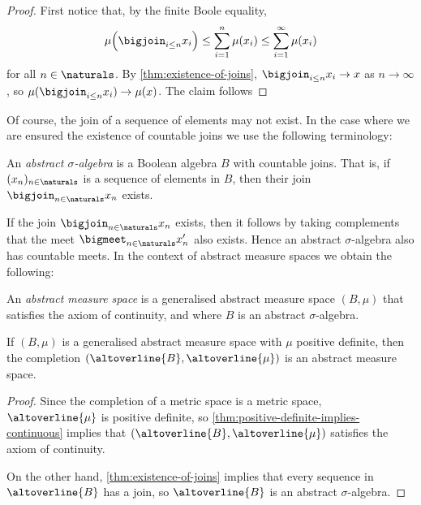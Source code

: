 \documentclass[article, a4paper, 11pt, oneside]{memoir}
\numberwithin{equation}{chapter}
\begin{document}
\begin{proof}
    First notice that, by the finite Boole equality,
    \begin{equation*}
        \mu \Bigl( \bigjoin_{i \leq n} x_i \Bigr)
            \leq \sum_{i=1}^n \mu(x_i)
            \leq \sum_{i=1}^\infty \mu(x_i)
    \end{equation*}
    for all $n \in \naturals$. By \cref{thm:existence-of-joins}, $\bigjoin_{i \leq n} x_i \to x$ as $n \to \infty$, so $\mu( \bigjoin_{i \leq n} x_i ) \to \mu(x)$. The claim follows
\end{proof}


Of course, the join of a sequence of elements may not exist. In the case where we are ensured the existence of countable joins we use the following terminology:

\begin{definition}
    \label{def:abstract-sigma-algebra}
    An \emph{abstract $\sigma$-algebra} is a Boolean algebra $B$ with countable joins. That is, if $(x_n)_{n\in\naturals}$ is a sequence of elements in $B$, then their join $\bigjoin_{n\in\naturals} x_n$ exists.
\end{definition}
%
If the join $\bigjoin_{n\in\naturals} x_n$ exists, then it follows by taking complements that the meet $\bigmeet_{n\in\naturals} x_n'$ also exists. Hence an abstract $\sigma$-algebra also has countable meets. In the context of abstract measure spaces we obtain the following:

\begin{definition}
    \label{def:abstract-measure-space}
    An \emph{abstract measure space} is a generalised abstract measure space $(B,\mu)$ that satisfies the axiom of continuity, and where $B$ is an abstract $\sigma$-algebra.
\end{definition}

\begin{lemma}
    \label{thm:completion-gives-countable-additivity}
    If $(B,\mu)$ is a generalised abstract measure space with $\mu$ positive definite, then the completion $(\altoverline{B},\altoverline{\mu})$ is an abstract measure space.
\end{lemma}

\begin{proof}
    Since the completion of a metric space is a metric space, $\altoverline{\mu}$ is positive definite, so \cref{thm:positive-definite-implies-continuous} implies that $(\altoverline{B},\altoverline{\mu})$ satisfies the axiom of continuity.

    On the other hand, \cref{thm:existence-of-joins} implies that every sequence in $\altoverline{B}$ has a join, so $\altoverline{B}$ is an abstract $\sigma$-algebra.
\end{proof}
\end{document}
